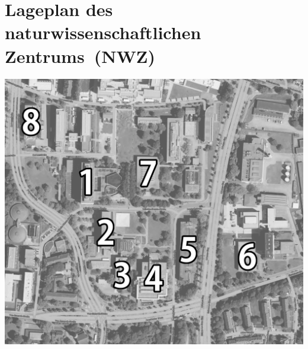
\section[Lageplan des naturwiss.\ Zentrums~(NWZ)]{Lageplan des naturwissenschaftlichen Zentrums~(NWZ)}

\includegraphics[width=\textwidth]{res/lageplan/physikvonoben.png}

\vspace{3\baselineskip}

